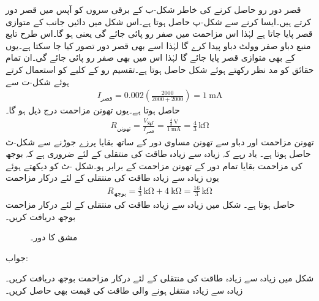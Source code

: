 قصر دور رو حاصل کرنے کی خاطر شکل-ب کے برقی سروں کو آپس میں قصر دور کرتے ہیں۔ایسا کرنے سے شکل-پ حاصل ہوتا ہے۔اس شکل میں دائیں جانب  کے متوازی قصر پایا جاتا ہے لہٰذا اس مزاحمت میں صفر رو پائی جائے گی  یعنی ہو گا۔اس طرح تابع منبع دباو صفر وولٹ دباو پیدا کرے گا لہٰذا اسے  بھی قصر دور  تصور کیا جا سکتا ہے۔یوں  کے بھی متوازی قصر پایا جائے گا لہٰذا اس میں بھی صفر رو پائی جائے گی۔ان تمام حقائق کو مد نظر رکھتے ہوئے شکل حاصل ہوتا ہے۔تقسیم رو کے کلیے کو استعمال کرتے ہوئے شکل-ت سے
\begin{align*}
I_{\text{قصر}} = 0.002\left(\frac{2000}{2000+2000}\right)=\SI{1}{\milli\ampere}
\end{align*}
حاصل ہوتا ہے۔یوں تھونن مزاحمت درج ذیل ہو گا۔
\begin{align*}
R_{\text{تھونن}}=\frac{V_{\text{کھلا}}}{I_{\text{قصر}}}=\frac{\frac{4}{3} \, \si{\volt}}{\SI{1}{\milli\ampere}}=\frac{4}{3}\, \si{\kilo\ohm}
\end{align*}
تھونن مزاحمت اور دباو سے تھونن مساوی دور کے ساتھ بقایا پرزے جوڑنے سے شکل-ٹ حاصل ہوتا ہے۔ یاد رہے کہ زیادہ سے زیادہ طاقت کی منتقلی کے لئے ضروری ہے کہ بوجھ کی مزاحمت بقایا تمام دور کے تھونن مزاحمت کے برابر ہو۔شکل -ٹ کو دیکھتے ہوئے یوں زیادہ سے زیادہ طاقت کی منتقلی کے لئے درکار مزاحمت
\begin{align*}
R_{\text{بوجھ}}=\frac{4}{3} \, \si{\kilo\ohm}+\SI{4}{\kilo\ohm}=\frac{16}{3}\, \si{\kilo\ohm}
\end{align*}
حاصل ہوتا ہے۔
شکل  میں زیادہ سے زیادہ طاقت کی منتقلی کے لئے درکار مزاحمت بوجھ دریافت کریں۔

\begin{figure}
\centering
{}
\caption{مشق  کا دور۔}
\label{شکل_مسئلہ_مشق_منتقلی_طاقت_الف}
\end{figure}

جواب:

شکل  میں زیادہ سے زیادہ طاقت کی منتقلی کے لئے درکار مزاحمت بوجھ دریافت کریں۔زیادہ سے زیادہ منتقل ہونے والی طاقت کی قیمت بھی حاصل کریں۔

